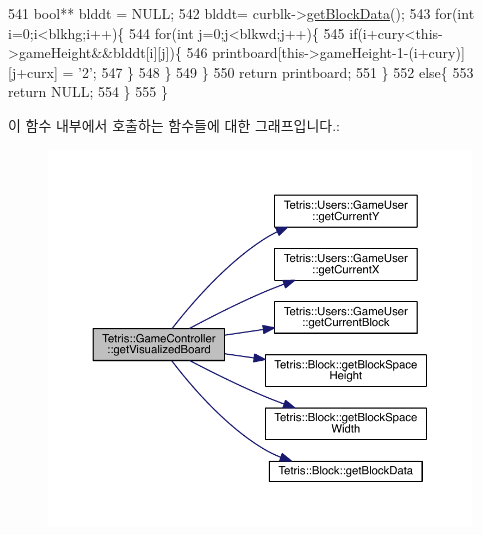 \begin{DoxyCode}
541                      \textcolor{keywordtype}{bool}** blddt = NULL;
542                     blddt= curblk->\hyperlink{class_tetris_1_1_block_a9bd2c3d6ccacff9a5f56f72336ba324f}{getBlockData}();
543                     \textcolor{keywordflow}{for}(\textcolor{keywordtype}{int} i=0;i<blkhg;i++)\{
544                         \textcolor{keywordflow}{for}(\textcolor{keywordtype}{int} j=0;j<blkwd;j++)\{
545                             \textcolor{keywordflow}{if}(i+cury<this->gameHeight&&blddt[i][j])\{
546                                 printboard[this->gameHeight-1-(i+cury)][j+curx] = \textcolor{charliteral}{'2'};
547                             \}
548                         \}
549                     \}
550                     \textcolor{keywordflow}{return} printboard;
551                 \}
552                 \textcolor{keywordflow}{else}\{
553                     \textcolor{keywordflow}{return} NULL;
554                 \}
555             \}
\end{DoxyCode}
이 함수 내부에서 호출하는 함수들에 대한 그래프입니다.\+:
\nopagebreak
\begin{figure}[H]
\begin{center}
\leavevmode
\includegraphics[width=350pt]{db/dd2/class_tetris_1_1_game_controller_aa0d81626f41c784dc256069293719e5f_cgraph}
\end{center}
\end{figure}
\mbox{\label{class_tetris_1_1_game_controller_a6c0d944a3e90caede9a216cb3537db44}} 
